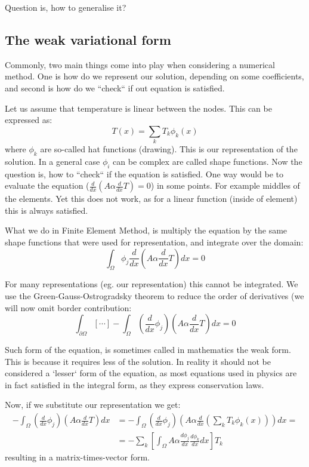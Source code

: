 \documentclass{article}
\begin{document}
Question is, how to generalise it?
\subsection{The weak variational form}
Commonly, two main things come into play when considering a numerical method. One is how do we represent our solution, depending on some coefficients, and second is how do we ``check`` if out equation is satisfied.

Let us assume that temperature is linear between the nodes. This can be expressed as:
\[T(x) = \sum_k T_k\phi_k(x)\]
where $\phi_k$ are so-called hat functions (drawing). This is our representation of the solution. In a general case $\phi_i$ can be complex are called shape functions. Now the question is, how to ``check`` if the equation is satisfied. One way would be to evaluate the equation ($\frac{d}{dx}\left(A\alpha\frac{d}{dx}T\right)=0$) in some points. For example middles of the elements. Yet this does not work, as for a linear function (inside of element) this is always satisfied.

What we do in Finite Element Method, is multiply the equation by the same shape functions that were used for representation, and integrate over the domain:
\[\int_\Omega\phi_j\frac{d}{dx}\left(A\alpha\frac{d}{dx}T\right)dx = 0\]

For many representations (eg. our representation) this cannot be integrated. We use the Green-Gauss-Ostrogradsky theorem to reduce the order of derivatives (we will now omit border contribution:
\[\int_{\partial\Omega}[\cdots]-\int_\Omega\left(\frac{d}{dx}\phi_j\right)\left(A\alpha\frac{d}{dx}T\right)dx = 0\]

Such form of the equation, is sometimes called in mathematics the weak form. This is because it requires less of the solution. In reality it should not be considered a `lesser` form of the equation, as most equations used in physics are in fact satisfied in the integral form, as they express conservation laws.

Now, if we substitute our representation we get:
\begin{align*}
-\int_\Omega\left(\frac{d}{dx}\phi_j\right)\left(A\alpha\frac{d}{dx}T\right)dx &= -\int_\Omega\left(\frac{d}{dx}\phi_j\right)\left(A\alpha\frac{d}{dx}\left(\sum_kT_k\phi_k(x)\right)\right)dx =\\
&= -\sum_k\left[\int_\Omega A\alpha\frac{d\phi_j}{dx}\frac{d\phi_k}{dx}dx\right]T_k 
\end{align*}
resulting in a matrix-times-vector form.
\end{document}
